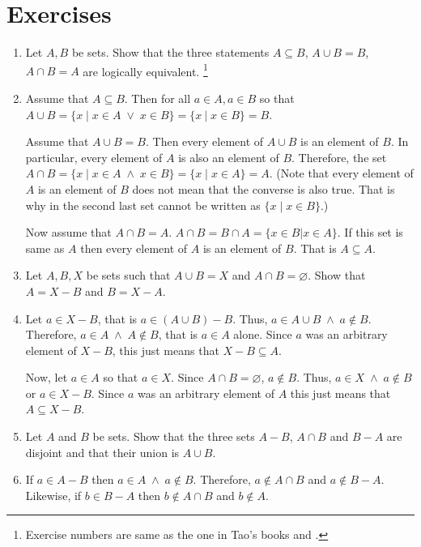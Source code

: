 \section{Exercises}
\begin{enumerate}
\item[Ex 3.1.5 ] Let $A, B$ be sets. Show that the three statements $A
\subseteq B$, $A \cup B = B$, $A \cap B = A$ are logically equivalent.
\footnote{Exercise numbers are same as the one in Tao's books 
\cite{tao2014a1} and \cite{tao2014a2}.}
\item[Solution: ] Assume that $A \subseteq B$. Then for all $a \in A, a
\in B$ so that $A \cup B = \{x \;|\; x \in A \;\lor\; x \in B\} = 
\{x \:|\; x \in B\} = B$.

Assume that $A \cup B = B$. Then every element of $A \cup B$ is an element
of $B$. In particular, every element of $A$ is also an element of $B$. 
Therefore, the set $A \cap B = \{x \;|\; x \in A \;\land\; x \in B\} = 
\{x \;|\; x \in A\} = A$. (Note that every element of $A$ is an element of
$B$ does not mean that the converse is also true. That is why in the
second last set cannot be written as $\{x \;|\; x \in B\}$.)

Now assume that $A \cap B = A$. $A \cap B = B \cap A = \{x \in B | x \in
A\}$. If this set is same as $A$ then every element of $A$ is an element
of $B$. That is $A \subseteq A$.

\item[Ex 3.1.9 ] Let $A, B, X$ be sets such that $A \cup B = X$ and $A
\cap B = \varnothing$. Show that $A = X - B$ and $B = X - A$.
\item[Solution: ] Let $a \in X - B$, that is $a \in (A \cup B) - B$. Thus,
$a \in A \cup B \;\land\; a \notin B$. Therefore, $a \in A \;\land\; A 
\notin B$, that is $a \in A$ alone. Since $a$ was an arbitrary element
of $X - B$, this just means that $X - B \subseteq A$.

Now, let $a \in A$ so that $a \in X$. Since $A \cap B = \varnothing$, $a
\notin B$. Thus, $a \in X \;\land\; a \notin B$ or $a \in X - B$. Since
$a$ was an arbitrary element of $A$ this just means that $A \subseteq X -
B$.

\item[Ex 3.1.10 ] Let $A$ and $B$ be sets. Show that the three sets $A - B$,
$A \cap B$ and $B - A$ are disjoint and that their union is $A \cup B$.
\item[Solution: ] If $a \in A - B$ then $a \in A \;\land\; a \notin B$. 
Therefore, $a \notin A \cap B$ and $a \notin B - A$. Likewise, if $b \in
B - A$ then $b \notin A \cap B$ and $b \notin A$.


\end{enumerate}
